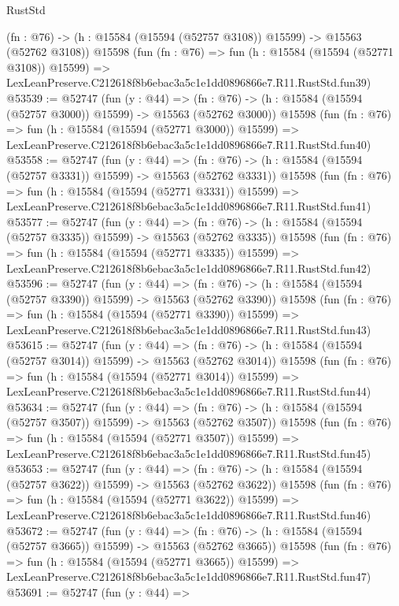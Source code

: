 \begin{lexlean}{RustStd}
\begin{coremodule}
    (fn : @76) -> (h : @15584 (@15594 (@52757 @3108)) @15599) -> @15563 (@52762 @3108))
    @15598
    (fun (fn : @76) =>
    fun (h : @15584 (@15594 (@52771 @3108)) @15599) =>
    LexLeanPreserve.C212618f8b6ebac3a5c1e1dd0896866e7.R11.RustStd.fun39)
@53539 := @52747
    (fun (y : @44) =>
    (fn : @76) -> (h : @15584 (@15594 (@52757 @3000)) @15599) -> @15563 (@52762 @3000))
    @15598
    (fun (fn : @76) =>
    fun (h : @15584 (@15594 (@52771 @3000)) @15599) =>
    LexLeanPreserve.C212618f8b6ebac3a5c1e1dd0896866e7.R11.RustStd.fun40)
@53558 := @52747
    (fun (y : @44) =>
    (fn : @76) -> (h : @15584 (@15594 (@52757 @3331)) @15599) -> @15563 (@52762 @3331))
    @15598
    (fun (fn : @76) =>
    fun (h : @15584 (@15594 (@52771 @3331)) @15599) =>
    LexLeanPreserve.C212618f8b6ebac3a5c1e1dd0896866e7.R11.RustStd.fun41)
@53577 := @52747
    (fun (y : @44) =>
    (fn : @76) -> (h : @15584 (@15594 (@52757 @3335)) @15599) -> @15563 (@52762 @3335))
    @15598
    (fun (fn : @76) =>
    fun (h : @15584 (@15594 (@52771 @3335)) @15599) =>
    LexLeanPreserve.C212618f8b6ebac3a5c1e1dd0896866e7.R11.RustStd.fun42)
@53596 := @52747
    (fun (y : @44) =>
    (fn : @76) -> (h : @15584 (@15594 (@52757 @3390)) @15599) -> @15563 (@52762 @3390))
    @15598
    (fun (fn : @76) =>
    fun (h : @15584 (@15594 (@52771 @3390)) @15599) =>
    LexLeanPreserve.C212618f8b6ebac3a5c1e1dd0896866e7.R11.RustStd.fun43)
@53615 := @52747
    (fun (y : @44) =>
    (fn : @76) -> (h : @15584 (@15594 (@52757 @3014)) @15599) -> @15563 (@52762 @3014))
    @15598
    (fun (fn : @76) =>
    fun (h : @15584 (@15594 (@52771 @3014)) @15599) =>
    LexLeanPreserve.C212618f8b6ebac3a5c1e1dd0896866e7.R11.RustStd.fun44)
@53634 := @52747
    (fun (y : @44) =>
    (fn : @76) -> (h : @15584 (@15594 (@52757 @3507)) @15599) -> @15563 (@52762 @3507))
    @15598
    (fun (fn : @76) =>
    fun (h : @15584 (@15594 (@52771 @3507)) @15599) =>
    LexLeanPreserve.C212618f8b6ebac3a5c1e1dd0896866e7.R11.RustStd.fun45)
@53653 := @52747
    (fun (y : @44) =>
    (fn : @76) -> (h : @15584 (@15594 (@52757 @3622)) @15599) -> @15563 (@52762 @3622))
    @15598
    (fun (fn : @76) =>
    fun (h : @15584 (@15594 (@52771 @3622)) @15599) =>
    LexLeanPreserve.C212618f8b6ebac3a5c1e1dd0896866e7.R11.RustStd.fun46)
@53672 := @52747
    (fun (y : @44) =>
    (fn : @76) -> (h : @15584 (@15594 (@52757 @3665)) @15599) -> @15563 (@52762 @3665))
    @15598
    (fun (fn : @76) =>
    fun (h : @15584 (@15594 (@52771 @3665)) @15599) =>
    LexLeanPreserve.C212618f8b6ebac3a5c1e1dd0896866e7.R11.RustStd.fun47)
@53691 := @52747
    (fun (y : @44) =>

\end{coremodule}
\end{lexlean}
